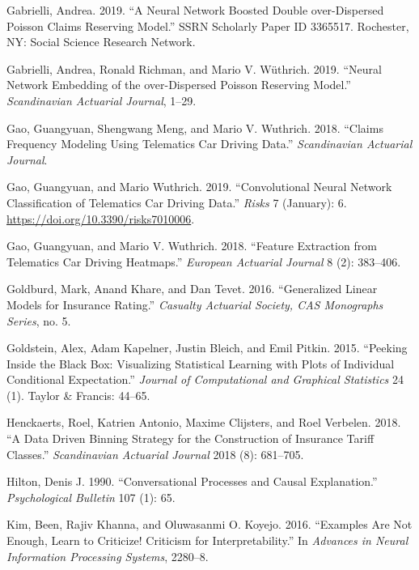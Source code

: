 \documentclass[preprint, 3p, twocolumn, letterpaper, 10pt]{elsarticle} %
\begin{document}
\leavevmode\hypertarget{ref-gabrielliNeuralNetwork2019}{}%
Gabrielli, Andrea. 2019. ``A Neural Network Boosted Double over-Dispersed Poisson Claims Reserving Model.'' SSRN Scholarly Paper ID 3365517. Rochester, NY: Social Science Research Network.

\leavevmode\hypertarget{ref-gabrielliNeuralNetwork2019a}{}%
Gabrielli, Andrea, Ronald Richman, and Mario V. Wüthrich. 2019. ``Neural Network Embedding of the over-Dispersed Poisson Reserving Model.'' \emph{Scandinavian Actuarial Journal}, 1--29.

\leavevmode\hypertarget{ref-gao_2018}{}%
Gao, Guangyuan, Shengwang Meng, and Mario V. Wuthrich. 2018. ``Claims Frequency Modeling Using Telematics Car Driving Data.'' \emph{Scandinavian Actuarial Journal}.

\leavevmode\hypertarget{ref-gao_2019}{}%
Gao, Guangyuan, and Mario Wuthrich. 2019. ``Convolutional Neural Network Classification of Telematics Car Driving Data.'' \emph{Risks} 7 (January): 6. \url{https://doi.org/10.3390/risks7010006}.

\leavevmode\hypertarget{ref-gao_2018_2}{}%
Gao, Guangyuan, and Mario V. Wuthrich. 2018. ``Feature Extraction from Telematics Car Driving Heatmaps.'' \emph{European Actuarial Journal} 8 (2): 383--406.

\leavevmode\hypertarget{ref-goldburd_2016}{}%
Goldburd, Mark, Anand Khare, and Dan Tevet. 2016. ``Generalized Linear Models for Insurance Rating.'' \emph{Casualty Actuarial Society, CAS Monographs Series}, no. 5.

\leavevmode\hypertarget{ref-goldstein2015peeking}{}%
Goldstein, Alex, Adam Kapelner, Justin Bleich, and Emil Pitkin. 2015. ``Peeking Inside the Black Box: Visualizing Statistical Learning with Plots of Individual Conditional Expectation.'' \emph{Journal of Computational and Graphical Statistics} 24 (1). Taylor \& Francis: 44--65.

\leavevmode\hypertarget{ref-henckaerts_2018}{}%
Henckaerts, Roel, Katrien Antonio, Maxime Clijsters, and Roel Verbelen. 2018. ``A Data Driven Binning Strategy for the Construction of Insurance Tariff Classes.'' \emph{Scandinavian Actuarial Journal} 2018 (8): 681--705.

\leavevmode\hypertarget{ref-hiltonConversationalProcesses1990}{}%
Hilton, Denis J. 1990. ``Conversational Processes and Causal Explanation.'' \emph{Psychological Bulletin} 107 (1): 65.

\leavevmode\hypertarget{ref-kimExamplesAre2016}{}%
Kim, Been, Rajiv Khanna, and Oluwasanmi O. Koyejo. 2016. ``Examples Are Not Enough, Learn to Criticize! Criticism for Interpretability.'' In \emph{Advances in Neural Information Processing Systems}, 2280--8.
\end{document}
